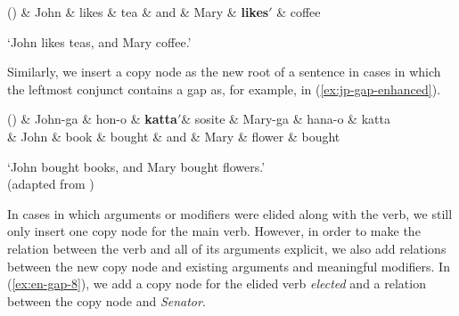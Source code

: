 \documentclass[lucida,biblatex]{sp} %
\newcounter{excounter}
\begin{document}
\begin{center}
\label{ex:en-gap-7}
\footnotesize
  \begin{dependency}[edge unit distance=2.5ex]
    \begin{deptext}[column sep=0.2cm]
    (\theexcounter) \& John \& likes \& tea \& and \& Mary \& \textbf{likes$'$} \& coffee \\
    \end{deptext}
  \end{dependency}
    \trans `John likes teas, and Mary coffee.'
\end{center}
Similarly, we insert a copy node as the new root of a sentence in cases in which the leftmost conjunct contains a gap as, for example, in (\ref{ex:jp-gap-enhanced}).
\begin{center}
  \label{ex:jp-gap-enhanced}
  \footnotesize
  \begin{dependency}[edge unit distance=2.5ex]
    \begin{deptext}[column sep=-0.025cm]
     (\theexcounter) \& John-ga \& hon-o \& \textbf{katta$'$}\& sosite  \& Mary-ga \& hana-o \& {katta} \\
     \& John  \& book \& bought \& and \& Mary \& flower \& bought \\
    \end{deptext}
  \end{dependency}
  \trans `John bought books, and Mary bought flowers.' \\ \normalsize \null \hfill (adapted from \citet{Kato2006})
\end{center}
In cases in which arguments or modifiers were elided along with the verb, we still only insert one copy node for the main verb. However, in order to make the relation between the verb and all of its arguments explicit, we also add relations between the new copy node and existing arguments and meaningful modifiers. In (\ref{ex:en-gap-8}), we add a copy node for the elided verb \textit{elected} and a relation between the copy node and \textit{Senator}.
\end{document}
